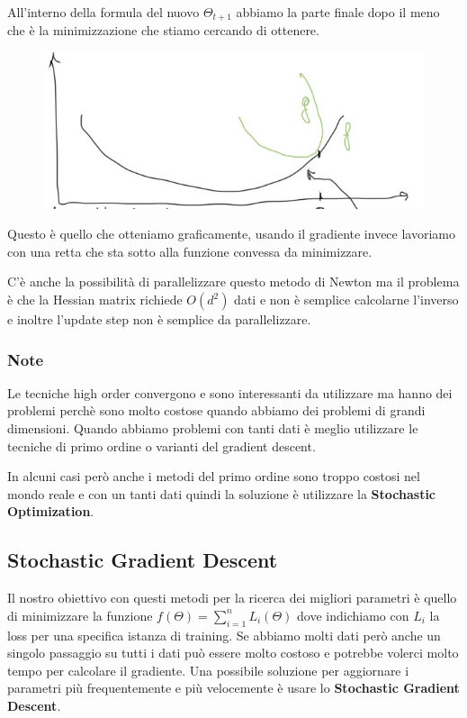 \documentclass[14pt]{extreport}
\begin{document}
All'interno della formula del nuovo $\Theta_{t+1}$ abbiamo la parte finale dopo il meno che è la minimizzazione che stiamo cercando di ottenere.
\begin{figure}[H]
\centering
\includegraphics[width=0.7\linewidth]{258.jpeg}
\end{figure}

Questo è quello che otteniamo graficamente, usando il gradiente invece lavoriamo con una retta che sta sotto alla funzione convessa da minimizzare.

C'è anche la possibilità di parallelizzare questo metodo di Newton ma il problema è che la Hessian matrix richiede $O(d^2)$ dati e non è semplice
calcolarne l'inverso e inoltre l'update step non è semplice da parallelizzare.

\subsubsection{Note}

Le tecniche high order convergono e sono interessanti da utilizzare ma hanno dei problemi perchè sono molto costose quando abbiamo dei problemi di
grandi dimensioni. Quando abbiamo problemi con tanti dati è meglio utilizzare le tecniche di primo ordine o varianti del gradient descent.

In alcuni casi però anche i metodi del primo ordine sono troppo costosi nel mondo reale e con un tanti dati quindi la soluzione è utilizzare la
\textbf{Stochastic Optimization}.

\subsection{Stochastic Gradient Descent}

Il nostro obiettivo con questi metodi per la ricerca dei migliori parametri è quello di minimizzare la funzione $f(\Theta) = \sum_{i=1}^n L_i(\Theta)$
dove indichiamo con $L_i$ la loss per una specifica istanza di training. Se abbiamo molti dati però anche un singolo passaggio su tutti i dati può
essere molto costoso e potrebbe volerci molto tempo per calcolare il gradiente. Una possibile soluzione per aggiornare i parametri più frequentemente
e più velocemente è usare lo \textbf{Stochastic Gradient Descent}.
\end{document}
